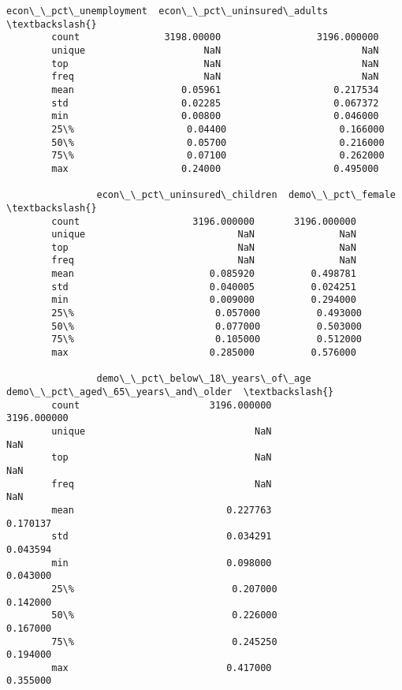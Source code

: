 \documentclass[11pt]{article}
\begin{document}
\begin{Verbatim}[commandchars=\\\{\}]
                econ\_\_pct\_unemployment  econ\_\_pct\_uninsured\_adults  \textbackslash{}
        count               3198.00000                 3196.000000   
        unique                     NaN                         NaN   
        top                        NaN                         NaN   
        freq                       NaN                         NaN   
        mean                   0.05961                    0.217534   
        std                    0.02285                    0.067372   
        min                    0.00800                    0.046000   
        25\%                    0.04400                    0.166000   
        50\%                    0.05700                    0.216000   
        75\%                    0.07100                    0.262000   
        max                    0.24000                    0.495000   
        
                econ\_\_pct\_uninsured\_children  demo\_\_pct\_female  \textbackslash{}
        count                    3196.000000       3196.000000   
        unique                           NaN               NaN   
        top                              NaN               NaN   
        freq                             NaN               NaN   
        mean                        0.085920          0.498781   
        std                         0.040005          0.024251   
        min                         0.009000          0.294000   
        25\%                         0.057000          0.493000   
        50\%                         0.077000          0.503000   
        75\%                         0.105000          0.512000   
        max                         0.285000          0.576000   
        
                demo\_\_pct\_below\_18\_years\_of\_age  demo\_\_pct\_aged\_65\_years\_and\_older  \textbackslash{}
        count                       3196.000000                        3196.000000   
        unique                              NaN                                NaN   
        top                                 NaN                                NaN   
        freq                                NaN                                NaN   
        mean                           0.227763                           0.170137   
        std                            0.034291                           0.043594   
        min                            0.098000                           0.043000   
        25\%                            0.207000                           0.142000   
        50\%                            0.226000                           0.167000   
        75\%                            0.245250                           0.194000   
        max                            0.417000                           0.355000   
        

\end{Verbatim}
\end{document}
